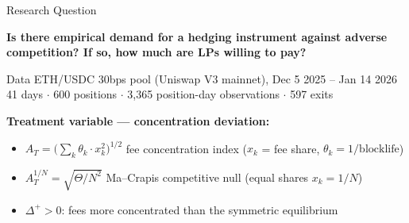 \documentclass[aspectratio=169]{beamer}
\newcommand{\AT}{A_T}
\newcommand{\ThetaSum}{\Theta}
\newcommand{\PosCount}{N}
\newcommand{\ATnull}{A_T^{1/\PosCount}}
\newcommand{\DeltaPlus}{\Delta^{+}}
\newcommand{\thetapos}{\theta}
\begin{document}
\begin{frame}{Research Question}

\textbf{Is there empirical demand for a hedging instrument against adverse
competition? If so, how much are LPs willing to pay?}

\bigskip

\begin{block}{Data}
ETH/USDC 30bps pool (Uniswap V3 mainnet), Dec 5 2025 -- Jan 14 2026 \\
41 days $\cdot$ 600 positions $\cdot$ 3,365 position-day observations $\cdot$ 597 exits
\end{block}

\bigskip

\textbf{Treatment variable --- concentration deviation:}
\begin{center}
\boxed{
  \DeltaPlus = \max\!\bigl(0,\; \AT - \ATnull\bigr)
}
\end{center}

\begin{itemize}
  \item $\AT = \bigl(\sum_k \thetapos_k \cdot x_k^2\bigr)^{1/2}$ \quad
    fee concentration index ($x_k$ = fee share, $\thetapos_k = 1/\text{blocklife}$)
  \item $\ATnull = \sqrt{\ThetaSum / \PosCount^2}$ \quad
    Ma--Crapis competitive null (equal shares $x_k = 1/\PosCount$)
  \item $\DeltaPlus > 0$: fees more concentrated than the symmetric equilibrium
\end{itemize}

\end{frame}
\end{document}
